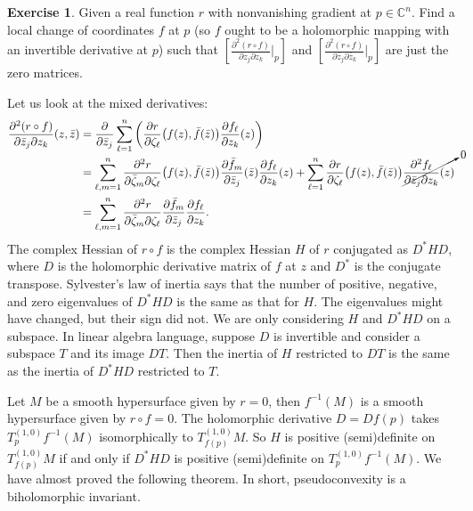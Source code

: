 \documentclass[12pt,openany]{book}
\newcommand{\C}{{\mathbb{C}}}
\theoremstyle{plain}
\theoremstyle{remark}
\theoremstyle{definition}
\newenvironment{exbox}{%
    \def\FrameCommand{\vrule width 1pt \relax\hspace {10pt}}%
    \MakeFramed {\advance \hsize -\width \FrameRestore }%
}{%
    \endMakeFramed
}
\theoremstyle{exercise}
\newtheorem{exercise}{Exercise}[section]
\theoremstyle{example}
\begin{document}
\begin{exbox}
\begin{exercise}
Given a real function $r$ with nonvanishing gradient at $p \in \C^n$.  Find
a local change of coordinates $f$ at $p$ (so $f$ ought to be a holomorphic
mapping with an invertible derivative at $p$) such that 
$\left[ \frac{\partial^2 (r \circ f)}{\partial z_j \partial z_k} \Big|_p \right]$
and
$\left[ \frac{\partial^2 (r \circ f)}{\partial \bar{z}_j \partial \bar{z}_k}
\Big|_p \right]$
are just the zero matrices.
\end{exercise}
\end{exbox}

Let us look at the mixed derivatives:
\begin{equation*}
\begin{split}
\frac{\partial^2 (r \circ f)}{\partial \bar{z}_j \partial z_k} (z,\bar{z})
& =
\frac{\partial}{\partial \bar{z}_j }
\sum_{\ell=1}^n 
\left(
\frac{\partial r}{\partial \zeta_\ell} \bigl(f(z),\bar{f}(\bar{z})\bigr)
\frac{\partial f_\ell}{\partial z_k} (z) 
\right)
\\
& =
\sum_{\ell,m=1}^n 
\frac{\partial^2 r}{\partial \bar{\zeta}_m \partial \zeta_\ell }
\bigl(f(z),\bar{f}(\bar{z})\bigr)
\frac{\partial \bar{f}_m}{\partial \bar{z}_j} (\bar{z}) 
\frac{\partial f_\ell}{\partial z_k} (z) 
+
\sum_{\ell=1}^n 
\frac{\partial r}{\partial \zeta_\ell} \bigl(f(z),\bar{f}(\bar{z})\bigr)
\smash{\cancelto{0}{\frac{\partial^2 f_\ell}{\partial \bar{z}_j \partial
z_k} (z)}}
\\
&=
\sum_{\ell,m=1}^n 
\frac{\partial^2 r}{\partial \bar{\zeta}_m \partial \zeta_\ell}
\frac{\partial \bar{f}_m}{\partial \bar{z}_j} 
\frac{\partial f_\ell}{\partial z_k} .
\end{split}
\end{equation*}
The complex Hessian of $r \circ f$ is the complex Hessian $H$ of $r$
conjugated as $D^*HD$, where $D$ is the holomorphic
derivative matrix of $f$ at $z$ and
$D^*$ is the conjugate transpose.  Sylvester's law of inertia 
says that the number of positive, negative, and zero
eigenvalues of $D^*HD$ is the same as that for $H$.  The
eigenvalues might have changed, but their sign did not.
We are only considering $H$ and $D^*HD$ on a subspace.  In linear algebra
language, suppose $D$ is invertible and consider a subspace $T$ and its
image $DT$.  Then the inertia of $H$ restricted to $DT$ is the same
as the inertia of $D^*HD$ restricted to $T$.

Let $M$ be a smooth hypersurface given by $r=0$, then $f^{-1}(M)$ is
a smooth hypersurface given by $r \circ f = 0$.
The holomorphic derivative $D = Df(p)$ 
takes
$T_{p}^{(1,0)}f^{-1}(M)$ isomorphically to $T_{f(p)}^{(1,0)}M$.
So $H$ is positive (semi)definite
on $T_{f(p)}^{(1,0)}M$ if and only if $D^*HD$ is positive (semi)definite
on $T_{p}^{(1,0)} f^{-1}(M)$.
We have almost proved the following theorem.  In short, pseudoconvexity is a
biholomorphic invariant.
\end{document}
